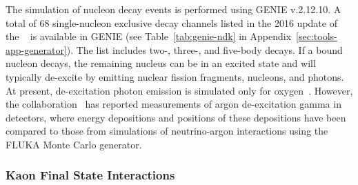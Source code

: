 The simulation of nucleon decay events is performed using GENIE v.2.12.10. 
A total of 68 single-nucleon exclusive decay channels listed in the 2016 update of the ~\cite{Patrignani:2016xqp} is available in GENIE (see Table~\ref{tab:genie-ndk} 
in Appendix~\ref{sec:tools-app-generator}). The list includes two-, three-, and five-body decays. 
If a bound nucleon decays, the remaining nucleus can be in an excited state and will typically de-excite by emitting nuclear fission fragments, nucleons, and photons. At present, de-excitation photon emission is simulated only for oxygen~\cite{Andreopoulos:2015wxa}.  However, the \argoneut collaboration~\cite{Acciarri:2018myr} has reported measurements of argon de-excitation gamma in \lartpc detectors,
where energy depositions and positions of these depositions have been compared to those from simulations of neutrino-argon interactions using the FLUKA Monte Carlo generator.

\subsubsection{Kaon Final State Interactions}
\label{sec:final-state-interactions}

